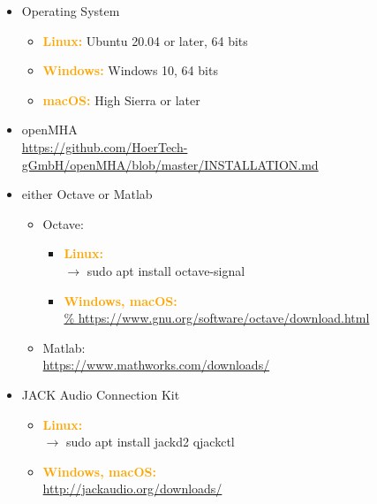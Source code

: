 \documentclass[11pt,a4paper,twoside]{article}
\newcommand{\+}{\discretionary{\mbox{\scriptsize$\hookleftarrow$}}{}{}}
\begin{document}
\begin{itemize}
\item \large{{Operating System}}
  \begin{itemize}
  \item \textcolor{orange}{\textbf{Linux:}} Ubuntu 20.04 or later, 64 bits
  \item \textcolor{orange}{\textbf{Windows:}} Windows 10, 64 bits
  \item \textcolor{orange}{\textbf{macOS:}} High Sierra or later
  \end{itemize}

\item \large{{openMHA}}   \\
  \footnotesize{\url{https://github.com/HoerTech-gGmbH/openMHA/blob/master/INSTALLATION.md}}
\item \large{{either Octave or Matlab}}
  \begin{itemize}
  \item \large{{Octave:}}
    \begin{itemize}
    \item \textcolor{orange}{\textbf{\large{Linux:}}} \\
      $\rightarrow$ {\ttfamily sudo apt install octave-signal}
    \item \textcolor{orange}{\textbf{Windows, macOS:}} \\
      \footnotesize{\url{%
          https://www.gnu.org/software/octave/download.html}}
    \end{itemize}
  \item \large{{Matlab:}} \\
    \footnotesize{\url{https://www.mathworks.com/downloads/}}
  \end{itemize}
\item \large{{JACK Audio Connection Kit}}
  \begin{itemize}
  \item \textcolor{orange}{\textbf{Linux:}} \\
    $\rightarrow$ {\ttfamily sudo apt install jackd2 qjackctl}
  \item \textcolor{orange}{\textbf{Windows, macOS:}} \\
    \footnotesize{\url{http://jackaudio.org/downloads/}}
  \end{itemize}
\end{itemize}
\end{document}
